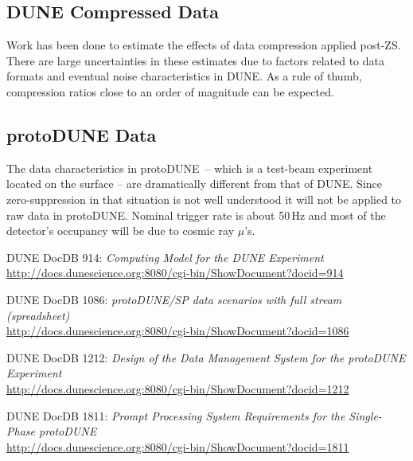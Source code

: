 \documentclass[pdftex,12pt,letter]{article}
\newcommand{\pd}{protoDUNE\xspace}
\begin{document}
\subsection{DUNE Compressed Data}
Work has been done to estimate the effects of data compression applied post-ZS. There are large uncertainties in these estimates due to
factors related to data formats and eventual noise characteristics in DUNE. As a rule of thumb, compression ratios close to an order of magnitude
can be expected.

\subsection{\pd Data}
The data characteristics in \pd\  -- which is a test-beam experiment located on the surface -- are dramatically different from that of DUNE.
Since zero-suppression in that situation is not well understood it will not be applied to raw data in \pd. Nominal trigger rate is about 50\,Hz
and most of the detector's occupancy will be due to cosmic ray $\mu$'s.


\begin{thebibliography}{1}
{DUNE DocDB 914: \textit{ Computing Model for the DUNE Experiment}}\\
\url{http://docs.dunescience.org:8080/cgi-bin/ShowDocument?docid=914}

{DUNE DocDB 1086: \textit{ protoDUNE/SP data scenarios with full stream (spreadsheet)}}\\
\url{http://docs.dunescience.org:8080/cgi-bin/ShowDocument?docid=1086}


{DUNE DocDB 1212: \textit{Design of the Data Management System for the protoDUNE Experiment}}\\
\url{http://docs.dunescience.org:8080/cgi-bin/ShowDocument?docid=1212}


{DUNE DocDB 1811: \textit{Prompt Processing System Requirements for the Single-Phase protoDUNE}}\\
\url{http://docs.dunescience.org:8080/cgi-bin/ShowDocument?docid=1811}
\end{thebibliography}
\end{document}
